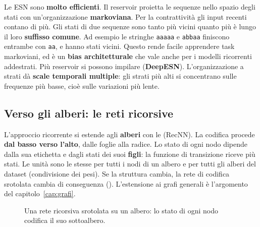 Le ESN sono \textbf{molto efficienti}. Il reservoir proietta le sequenze nello spazio degli stati con
un'organizzazione \textbf{markoviana}. Per la contrattività gli input recenti contano di più. Gli stati di due
sequenze sono tanto più vicini quanto più è lungo il loro \textbf{suffisso comune}. Ad esempio le stringhe
\texttt{aaaaa} e \texttt{abbaa} finiscono entrambe con \texttt{aa}, e hanno stati vicini. Questo rende facile
apprendere task markoviani, ed è un \textbf{bias architetturale} che vale anche per i modelli ricorrenti addestrati.
Più reservoir si possono impilare (\textbf{DeepESN}). L'organizzazione a strati dà \textbf{scale temporali
multiple}: gli strati più alti si concentrano sulle frequenze più basse, cioè sulle variazioni più lente.

\subsection{Verso gli alberi: le reti ricorsive}

L'approccio ricorrente si estende agli \textbf{alberi} con le  (RecNN). La codifica
procede \textbf{dal basso verso l'alto}, dalle foglie alla radice. Lo stato di ogni nodo dipende dalla sua etichetta
e dagli stati dei suoi \textbf{figli}: la funzione di transizione riceve più stati. Le unità sono le stesse per tutti
i nodi di un albero e per tutti gli alberi del dataset (condivisione dei pesi). Se la struttura cambia, la rete di
codifica srotolata cambia di conseguenza (). L'estensione ai grafi generali è l'argomento del
capitolo~\ref{cap:grafi}.

\begin{figure}[ht]
\centering
{}
\caption{Una rete ricorsiva srotolata su un albero: lo stato di ogni nodo codifica il suo sottoalbero.}
\label{fig:recnn}
\end{figure}

